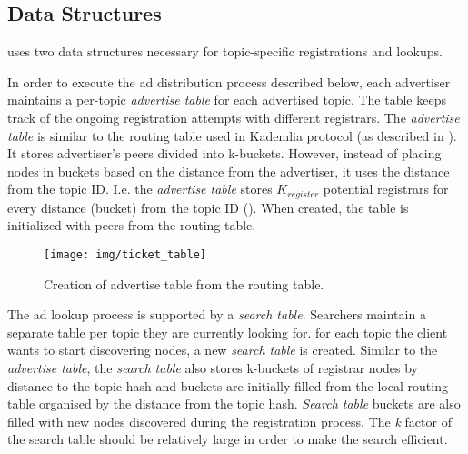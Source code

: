 \subsection{Data Structures}\label{sec:struct}
\sysname uses two data structures necessary for topic-specific registrations and lookups. 

In order to execute the ad distribution process described below,  each advertiser maintains a per-topic \emph{advertise table} for each advertised topic. The table keeps track of the ongoing registration attempts with different registrars.  The \emph{advertise table} is similar to the routing table used in Kademlia protocol (as described in ). It stores advertiser's peers divided into k-buckets. However, instead of placing nodes in buckets based on the distance from the advertiser, it uses the distance from the topic ID. I.e. the \emph{advertise table} stores $K_\textit{register}$ potential registrars for every distance (bucket) from the topic ID (). When created, the table is initialized with peers from the routing table. 

\begin{figure}
    \texttt{[image: img/ticket\_table]}
    \caption{Creation of advertise table from the routing table.}
    \label{fig:advertise_table}
 \end{figure}

The ad lookup process is supported by a \emph{search table}. 
Searchers maintain a separate table per topic they are currently looking for. 
\ie for each topic the client wants to start discovering nodes, a new \emph{search table} is created. 
Similar to the \emph{advertise table}, the \emph{search table} also stores k-buckets of registrar nodes by distance to the topic hash and buckets are initially filled from the local routing table organised by the distance from the topic hash.
\emph{Search table} buckets are also filled with new nodes discovered during the registration process.
The \emph{k} factor of the search table should be relatively large in order to make the search efficient. 


